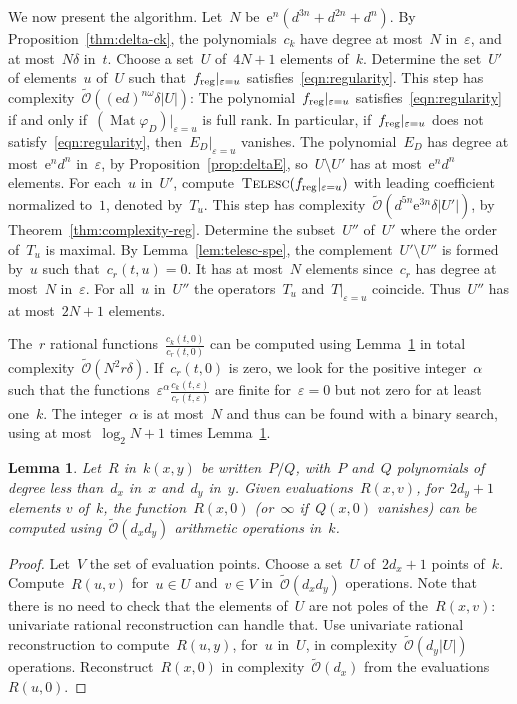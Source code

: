 \documentclass{sig-alternate}
\newtheorem{lem}[thm]{Lemma}
\newcommand{\tCreatTel}{\textsc{Telesc}}
\newcommand{\CreatTel}{\mathop{\textsc{\tCreatTel}}}
\newcommand{\softO}{\tilde{\mathcal{O}}}
\DeclareMathOperator{\Mat}{Mat}
\newcommand{\reg}{{\smash{\mathrm{reg}}}}
\newcommand{\eexp}{\mathrm{e}}
\begin{document}
We now present the algorithm.
Let~$N$ be~$\eexp^n(d^{3n}+d^{2n}+d^n)$.
By Proposition~\ref{thm:delta-ck}, the polynomials~$c_k$ have degree at most~$N$ in~$\varepsilon$, and at most~$N \delta$ in~$t$.
Choose a set~$U$ of~$4N+1$ elements of~$k$.
Determine the set~$U'$ of elements~$u$ of~$U$ such that~$f_\reg|_{\varepsilon=u}$ satisfies~\eqref{eqn:regularity}.
This step has complexity~$\softO\left( (\eexp d)^{n\omega}\delta|U| \right)$:
The polynomial~$f_\reg|_{\varepsilon=u}$ satisfies~\eqref{eqn:regularity} if and only if~$(\Mat\varphi_{D})|_{\varepsilon=u}$ is full rank.
In particular, if~$f_\reg|_{\varepsilon=u}$ does not satisfy~\eqref{eqn:regularity}, then~$E_{D}|_{\varepsilon=u}$ vanishes.
The polynomial~$E_{D}$ has degree at most~$\eexp^n d^n$ in~$\varepsilon$, by Proposition~\ref{prop:deltaE}, so~$U\setminus U'$ has at most~$\eexp^n d^n$ elements.
For each~$u$ in~$U'$, compute~$\CreatTel(f_\reg|_{\varepsilon=u})$ with leading coefficient normalized to~$1$, denoted by~$T_u$.
This step has complexity~$\softO(d^{5n}\eexp^{3n}\delta |U'|)$, by Theorem~\ref{thm:complexity-reg}.
Determine the subset~$U''$ of~$U'$ where the order of~$T_u$ is maximal.
By Lemma~\ref{lem:telesc-spe}, the complement~$U'\setminus U''$ is formed by~$u$ such that~$c_r(t,u)=0$.
It has at most~$N$ elements since~$c_r$ has degree at most~$N$ in~$\varepsilon$.
For all~$u$ in~$U''$ the operators~$T_u$ and~$T|_{\varepsilon=u}$ coincide.
Thus~$U''$ has at most~$2N + 1$ elements.

The~$r$ rational functions~$\frac{c_k(t,0)}{c_r(t,0)}$ can be computed using Lemma~\ref{prop:rat-reval} in total complexity~$\softO( N^2r\delta )$.
If~$c_r(t,0)$ is zero, we look for the positive integer~$\alpha$ such that the functions~$\varepsilon^\alpha\frac{c_k(t,\varepsilon)}{c_r(t,\varepsilon)}$ are finite for~$\varepsilon=0$ but not zero for at least one~$k$.
The integer~$\alpha$ is at most~$N$ and thus can be found with a binary search, using at most~$\log_2 N+1$ times Lemma~\ref{prop:rat-reval}.

\begin{lem}\label{prop:rat-reval}
  Let~$R$ in~$k(x,y)$ be written~$P/Q$, with~$P$ and~$Q$ polynomials of degree less than~$d_x$ in~$x$ and~$d_y$ in~$y$.
  Given evaluations~$R(x,v)$, for~$2 d_y+1$ elements $v$ of~$k$, the function~$R(x,0)$ (or~$\infty$ if~$Q(x,0)$ vanishes) can be computed using~$\softO(d_x d_y)$ arithmetic operations in~$k$.
\end{lem}

\begin{proof}
  Let~$V$ the set of evaluation points.
  Choose a set~$U$ of~$2d_x+1$ points of~$k$.
  Compute~$R(u,v)$ for~$u\in U$ and~$v \in V$ in~$\softO(d_x d_y)$ operations.
  Note that there is no need to check that the elements of~$U$ are not poles of the~$R(x,v)$: univariate rational reconstruction can handle that.
  Use univariate rational reconstruction to compute~$R(u,y)$, for~$u$ in~$U$, in complexity~$\softO(d_y |U|)$ operations.
  Reconstruct~$R(x,0)$ in complexity~$\softO(d_x)$ from the evaluations~$R(u,0)$.
\end{proof}
\end{document}
